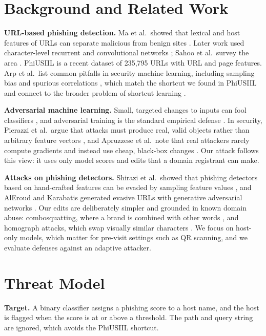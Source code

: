 \documentclass[conference]{IEEEtran}
\begin{document}
\section{Background and Related Work}

\textbf{URL-based phishing detection.} Ma et al.\ showed that lexical and host features of URLs can separate malicious from benign sites \cite{ma2009beyond}. Later work used character-level recurrent and convolutional networks \cite{bahnsen2017rnn, le2018urlnet}; Sahoo et al.\ survey the area \cite{sahoo2017survey}. PhiUSIIL \cite{prasad2024phiusiil} is a recent dataset of 235,795 URLs with URL and page features. Arp et al.\ list common pitfalls in security machine learning, including sampling bias and spurious correlations \cite{arp2022dos}, which match the shortcut we found in PhiUSIIL and connect to the broader problem of shortcut learning \cite{geirhos2020shortcut}.

\textbf{Adversarial machine learning.} Small, targeted changes to inputs can fool classifiers \cite{goodfellow2015explaining, biggio2018wild}, and adversarial training is the standard empirical defense \cite{madry2018towards}. In security, Pierazzi et al.\ argue that attacks must produce real, valid objects rather than arbitrary feature vectors \cite{pierazzi2020problemspace}, and Apruzzese et al.\ note that real attackers rarely compute gradients and instead use cheap, black-box changes \cite{apruzzese2023real}. Our attack follows this view: it uses only model scores and edits that a domain registrant can make.

\textbf{Attacks on phishing detectors.} Shirazi et al.\ showed that phishing detectors based on hand-crafted features can be evaded by sampling feature values \cite{shirazi2019adversarial}, and AlEroud and Karabatis generated evasive URLs with generative adversarial networks \cite{aleroud2020bypassing}. Our edits are deliberately simpler and grounded in known domain abuse: combosquatting, where a brand is combined with other words \cite{kintis2017combosquatting}, and homograph attacks, which swap visually similar characters \cite{holgers2006homograph}. We focus on host-only models, which matter for pre-visit settings such as QR scanning, and we evaluate defenses against an adaptive attacker.

\section{Threat Model}

\textbf{Target.} A binary classifier assigns a phishing score to a host name, and the host is flagged when the score is at or above a threshold. The path and query string are ignored, which avoids the PhiUSIIL shortcut.
\end{document}
